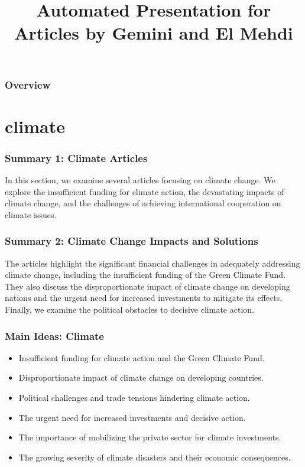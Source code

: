 \documentclass{beamer}
\title{Automated Presentation for Articles by Gemini and El Mehdi}
\date{}
\begin{document}
\maketitle

\begin{frame}
\frametitle{Overview}
\tableofcontents
\end{frame}

\section{climate}

\begin{frame}
\frametitle{Summary 1: Climate Articles}
In this section, we examine several articles focusing on climate change.  We explore the insufficient funding for climate action, the devastating impacts of climate change, and the challenges of achieving international cooperation on climate issues.
\end{frame}

\begin{frame}
\frametitle{Summary 2: Climate Change Impacts and Solutions}
The articles highlight the significant financial challenges in adequately addressing climate change, including the insufficient funding of the Green Climate Fund. They also discuss the disproportionate impact of climate change on developing nations and the urgent need for increased investments to mitigate its effects.  Finally, we examine the political obstacles to decisive climate action.
\end{frame}

\begin{frame}
\frametitle{Main Ideas: Climate}
\begin{itemize}
    \item Insufficient funding for climate action and the Green Climate Fund.
    \item Disproportionate impact of climate change on developing countries.
    \item Political challenges and trade tensions hindering climate action.
    \item The urgent need for increased investments and decisive action.
    \item The importance of mobilizing the private sector for climate investments.
    \item The growing severity of climate disasters and their economic consequences.
\end{itemize}
\end{frame}
\end{document}
